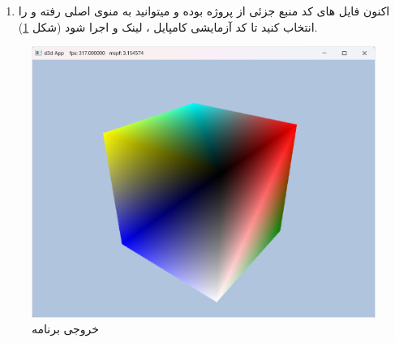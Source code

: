 {\begin{spacing}{1.5}
\begin{enumerate}
            \item {اکنون فایل های کد منبع جزئی از پروژه بوده و میتوانید به منوی اصلی رفته و  را انتخاب کنید تا کد آزمایشی کامپایل ، لینک و اجرا شود (شکل \ref{fig:3.Intro.5.10}).}
        \end{enumerate}

        \begin{figure}[H]
            \centering
            \setlength{\belowcaptionskip}{-10pt}
            \includegraphics[width=\textwidth]{Images/3/3.Intro.5.10}
            \caption{خروجی برنامه}
            \label{fig:3.Intro.5.10}
        \end{figure}
    \end{spacing}
}
\textbf{\vspace{-10pt}}

